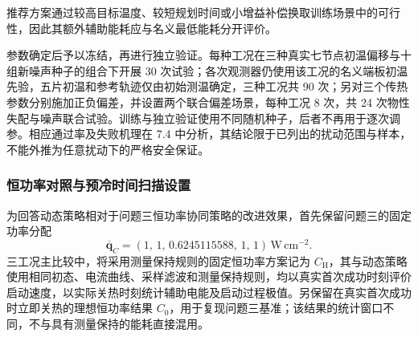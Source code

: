 \documentclass[bwprint]{gmcmthesis}
\numberwithin{equation}{section}
\numberwithin{figure}{section}
\begin{document}
\begin{table}[htbp]
    \centering
    \caption{三种预冷工况的名义节能与推荐留裕度控制参数}
    \vspace{0.3cm}
    \label{B7-control-parameters}
    \renewcommand{\arraystretch}{1.5}
\end{table}

推荐方案通过较高目标温度、较短规划时间或小增益补偿换取训练场景中的可行性，因此其额外辅助能耗应与名义最低能耗分开评价。

参数确定后予以冻结，再进行独立验证。每种工况在三种真实七节点初温偏移与十组新噪声种子的组合下开展 30 次试验；各次观测器仍使用该工况的名义端板初温先验，五片初温和参考轨迹仅由初始测温确定，三种工况共 90 次；另对三个传热参数分别施加正负偏差，并设置两个联合偏差场景，每种工况 8 次，共 24 次物性失配与噪声联合试验。训练与独立验证使用不同随机种子，后者不再用于逐次调参。相应通过率及失败机理在 7.4 中分析，其结论限于已列出的扰动范围与样本，不能外推为任意扰动下的严格安全保证。

\subsubsection{恒功率对照与预冷时间扫描设置}
为回答动态策略相对于问题三恒功率协同策略的改进效果，首先保留问题三的固定功率分配
\begin{equation}
\overline{\boldsymbol q}_{C}=
(1,\,1,\,0.6245115588,\,1,\,1)\,\mathrm{W\,cm^{-2}}.
\label{eq:q4:solver_constant_power}
\end{equation}
三工况主比较中，将采用测量保持规则的固定恒功率方案记为 \(C_{\mathrm H}\)，其与动态策略使用相同初态、电流曲线、采样滤波和测量保持规则，均以真实首次成功时刻评价启动速度，以实际关热时刻统计辅助电能及启动过程极值。另保留在真实首次成功时立即关热的理想恒功率结果 \(C_0\)，用于复现问题三基准；该结果的统计窗口不同，不与具有测量保持的能耗直接混用。
\end{document}
